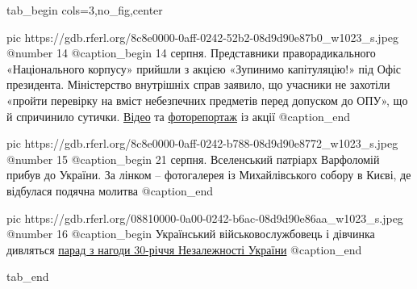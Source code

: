  
 
 
 
 


\ifcmt
  tab_begin cols=3,no_fig,center

     pic https://gdb.rferl.org/8c8e0000-0aff-0242-52b2-08d9d90e87b0_w1023_s.jpeg
		 @number 14
		 @caption_begin
14 серпня. Представники праворадикального «Національного корпусу» прийшли з
акцією «Зупинимо капітуляцію!» під Офіс президента. Міністерство внутрішніх
справ заявило, що учасники не захотіли «пройти перевірку на вміст небезпечних
предметів перед допуском до ОПУ», що й спричинило сутички. \href{https://www.radiosvoboda.org/a/na-akciyi-zupynemo-kapitulyaciyu-stalysya-sutychky/31410640.html}{Відео} та
\href{https://www.radiosvoboda.org/a/predstavnyky-nackorpusu-pid-ofisom-prezydenta/31410741.html}{фоторепортаж} із акції
		 @caption_end

		 pic https://gdb.rferl.org/8c8e0000-0aff-0242-b788-08d9d90e8772_w1023_s.jpeg
		 @number 15
		 @caption_begin
21 серпня. Вселенський патріарх Варфоломій прибув до України. За лінком –
фотогалерея із Михайлівського собору в Києві, де відбулася подячна молитва
		 @caption_end

		 pic https://gdb.rferl.org/08810000-0a00-0242-b6ac-08d9d90e86aa_w1023_s.jpeg
		 @number 16
		 @caption_begin
Український військовослужбовець і дівчинка дивляться \href{https://www.radiosvoboda.org/a/photo-kyiv-den-nezalezhnosti-2021/31426422.html}{парад з нагоди 30-річчя Незалежності України}
		 @caption_end

  tab_end
\fi

